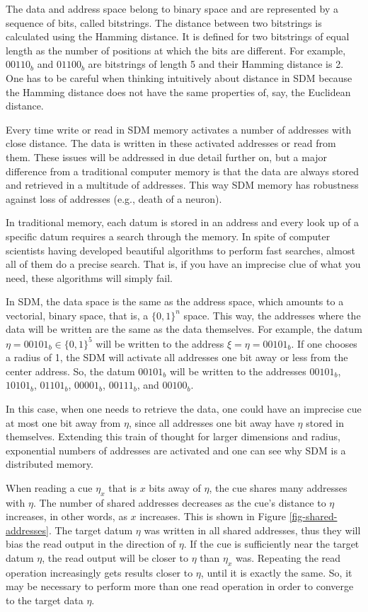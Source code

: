 The data and address space belong to binary space and are represented by a sequence of bits, called bitstrings. The distance between two bitstrings is calculated using the Hamming distance. It is defined for two bitstrings of equal length as the number of positions at which the bits are different. For example, $00110_{b}$ and $01100_{b}$ are bitstrings of length 5 and their Hamming distance is 2. One has to be careful when thinking intuitively about distance in SDM because the Hamming distance does not have the same properties of, say, the Euclidean distance.

Every time write or read in SDM memory activates a number of addresses with close distance.  The data is written in these activated addresses or read from them.  These issues will be addressed in due detail further on, but a major difference from a traditional computer memory is that the data are always stored and retrieved in a multitude of addresses. This way SDM memory has robustness against loss of addresses (e.g., death of a neuron).

In traditional memory, each datum is stored in an address and every look up of a specific datum requires a search through the memory. In spite of computer scientists having developed beautiful algorithms to perform fast searches, almost all of them do a precise search. That is, if you have an imprecise clue of what you need, these algorithms will simply fail.

In SDM, the data space is the same as the address space, which amounts to a vectorial, binary space, that is, a $\{0,1\}^{n}$ space. This way, the addresses where the data will be written are the same as the data themselves. For example, the datum $\eta=00101_{b}\in\{0,1\}^{5}$ will be written to the address $\xi=\eta=00101_{b}$. If one chooses a radius of 1, the SDM will activate all addresses one bit away or less from the center address. So, the datum $00101_{b}$ will be written to the addresses $00101_{b}$, $10101_{b}$, $01101_{b}$, $00001_{b}$, $00111_{b}$, and $00100_{b}$.

In this case, when one needs to retrieve the data, one could have an imprecise cue at most one bit away from $\eta$, since all addresses one bit away have $\eta$ stored in themselves.  Extending this train of thought for larger dimensions and radius, exponential numbers of addresses are activated and one can see why SDM is a distributed memory.

When reading a cue $\eta_{x}$ that is $x$ bits away of $\eta$, the cue shares many addresses with $\eta$. The number of shared addresses decreases as the cue's distance to $\eta$ increases, in other words, as $x$ increases. This is shown in Figure \ref{fig-shared-addresses}.  The target datum $\eta$ was written in all shared addresses, thus they will bias the read output in the direction of $\eta$. If the cue is sufficiently near the target datum $\eta$, the read output will be closer to $\eta$ than $\eta_{x}$ was. Repeating the read operation increasingly gets results closer to $\eta$, until it is exactly the same. So, it may be necessary to perform more than one read operation in order to converge to the target data $\eta$.

